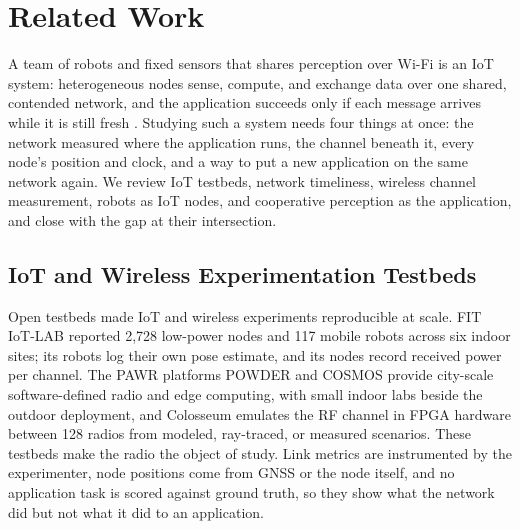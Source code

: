 \section{Related Work}
\label{sec:related}

A team of robots and fixed sensors that shares perception over Wi-Fi
is an IoT system: heterogeneous nodes sense, compute, and exchange
data over one shared, contended network, and the application succeeds
only if each message arrives while it is still fresh
\cite{simoens2018iort}. Studying such a system needs four things at
once: the network measured where the application runs, the channel
beneath it, every node's position and clock, and a way to put a new
application on the same network again. We review IoT testbeds, network
timeliness, wireless channel measurement, robots as IoT nodes, and
cooperative perception as the application, and close with the gap at
their intersection.

\subsection{IoT and Wireless Experimentation Testbeds}
Open testbeds made IoT and wireless experiments reproducible at scale.
FIT IoT-LAB \cite{adjih2015iotlab} reported 2,728 low-power nodes and
117 mobile robots across six indoor sites; its robots log their own
pose estimate, and its nodes record received power per channel. The
PAWR platforms POWDER \cite{breen2021powder} and COSMOS
\cite{raychaudhuri2020cosmos} provide city-scale software-defined
radio and edge computing, with small indoor labs beside the outdoor
deployment, and Colosseum \cite{bonati2021colosseum} emulates the RF
channel in FPGA hardware between 128 radios from modeled, ray-traced,
or measured scenarios. These testbeds make the radio the object of
study. Link metrics are instrumented by the experimenter, node
positions come from GNSS or the node itself, and no application task
is scored against ground truth, so they show what the network did but
not what it did to an application.


